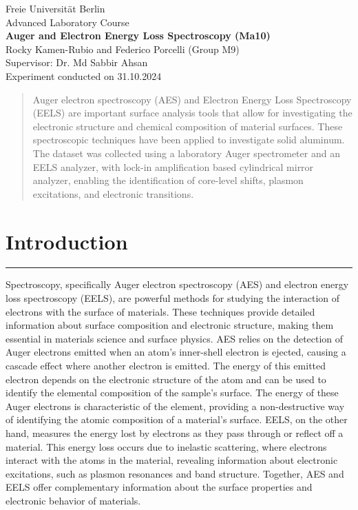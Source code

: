 \documentclass[12pt]{article}
\begin{document}
\begin{center}
\huge{Freie Universität Berlin}\\[10pt]
\huge{Advanced Laboratory Course}\\[50pt]
\huge{\textbf{Auger and Electron Energy Loss Spectroscopy (Ma10)}}\\[60pt]
\large{Rocky Kamen-Rubio and Federico Porcelli (Group M9)}\\[30pt]
\large{Supervisor: Dr. Md Sabbir Ahsan}\\[30pt]
\large{Experiment conducted on 31.10.2024}\\[30pt]
\end{center}

\begin{abstract}
\justifying Auger electron spectroscopy (AES) and Electron Energy Loss Spectroscopy (EELS) are important surface analysis tools that allow for investigating the electronic structure and chemical composition of material surfaces. These spectroscopic techniques have been applied to investigate solid aluminum. The dataset was collected using a laboratory Auger spectrometer and an EELS analyzer, with lock-in amplification based cylindrical mirror analyzer, enabling the identification of core-level shifts, plasmon excitations, and electronic transitions.
\end{abstract}

\tableofcontents

\section{Introduction}
\rule{\textwidth}{0.5pt}
\justifying
Spectroscopy, specifically Auger electron spectroscopy (AES) and electron energy loss spectroscopy (EELS), are powerful methods for studying the interaction of electrons with the surface of materials. These techniques provide detailed information about surface composition and electronic structure, making them essential in materials science and surface physics. AES relies on the detection of Auger electrons emitted when an atom’s inner-shell electron is ejected, causing a cascade effect where another electron is emitted. The energy of this emitted electron depends on the electronic structure of the atom and can be used to identify the elemental composition of the sample’s surface. The energy of these Auger electrons is characteristic of the element, providing a non-destructive way of identifying the atomic composition of a material’s surface. EELS, on the other hand, measures the energy lost by electrons as they pass through or reflect off a material. This energy loss occurs due to inelastic scattering, where electrons interact with the atoms in the material, revealing information about electronic excitations, such as plasmon resonances and band structure. Together, AES and EELS offer complementary information about the surface properties and electronic behavior of materials.
\end{document}
